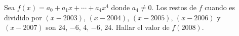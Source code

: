 \begin{example}
    Sea $f(x) = a_0 + a_1 x + \cdots + a_4 x^4$ donde $a_4 \neq 0$.
    Los restos de $f$ cuando es dividido por $(x - 2003)$, $(x - 2004)$, $(x - 2005)$, $(x - 2006)$ y $(x - 2007)$ son 24, $-6$, 4, $-6$, 24.
    Hallar el valor de $f(2008)$.
\end{example}


